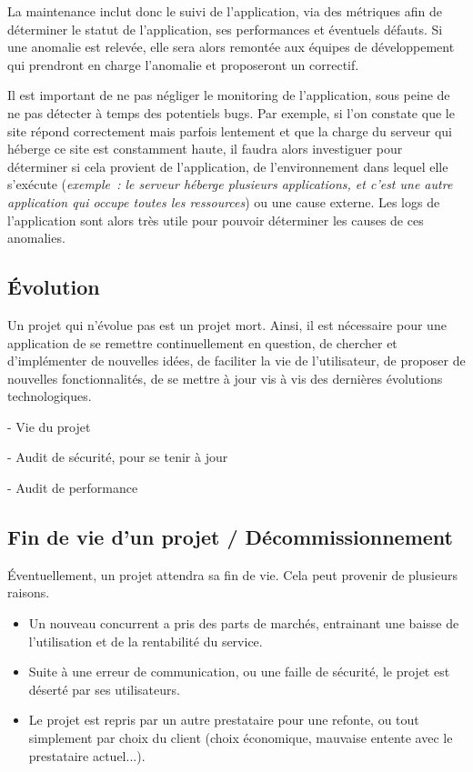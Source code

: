 La maintenance inclut donc le suivi de l'application, via des métriques afin de déterminer le statut de l'application, ses performances et éventuels défauts. Si une anomalie est relevée, elle sera alors remontée aux équipes de développement qui prendront en charge l'anomalie et proposeront un correctif.

Il est important de ne pas négliger le monitoring de l'application, sous peine de ne pas détecter à temps des potentiels bugs. Par exemple, si l'on constate que le site répond correctement mais parfois lentement et que la charge du serveur qui héberge ce site est constamment haute, il faudra alors investiguer pour déterminer si cela provient de l'application, de l'environnement dans lequel elle s'exécute (\emph{exemple : le serveur héberge plusieurs applications, et c'est une autre application qui occupe toutes les ressources}) ou une cause externe. Les logs de l'application sont alors très utile pour pouvoir déterminer les causes de ces anomalies.


\subsection{Évolution}

Un projet qui n'évolue pas est un projet mort. Ainsi, il est nécessaire pour une application de se remettre continuellement en question, de chercher et d'implémenter de nouvelles idées, de faciliter la vie de l'utilisateur, de proposer de nouvelles fonctionnalités, de se mettre à jour vis à vis des dernières évolutions technologiques.


- Vie du projet

- Audit de sécurité, pour se tenir à jour

- Audit de performance

\subsection{Fin de vie d'un projet / Décommissionnement}

Éventuellement, un projet attendra sa fin de vie. Cela peut provenir de plusieurs raisons.

\begin{itemize}
	\item Un nouveau concurrent a pris des parts de marchés, entrainant une baisse de l'utilisation et de la rentabilité du service.
	\item Suite à une erreur de communication, ou une faille de sécurité, le projet est déserté par ses utilisateurs.
	\item Le projet est repris par un autre prestataire pour une refonte, ou tout simplement par choix du client (choix économique, mauvaise entente avec le prestataire actuel...).
\end{itemize}

